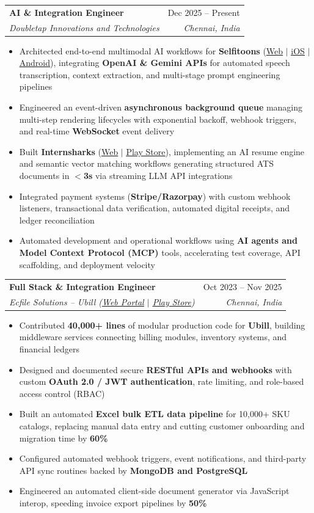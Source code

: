 \documentclass[letterpaper,10pt]{article}
\makeatletter
\newcommand{\resumeItem}[1]{
  \item\small{
    {#1 \vspace{-2pt}}
  }
}
\newcommand{\resumeSubheading}[4]{
  \vspace{-2pt}\item
    \begin{tabular*}{0.97\textwidth}[t]{l@{\extracolsep{\fill}}r}
      \textbf{#1} & #2 \\
      \textit{\small#3} & \textit{\small #4} \\
    \end{tabular*}\vspace{-6pt}
}
\newcommand{\resumeItemListStart}{\begin{itemize}}
\newcommand{\resumeItemListEnd}{\end{itemize}\vspace{-5pt}}
\makeatother
\begin{document}
    \resumeSubheading
      {AI \& Integration Engineer}{Dec 2025 -- Present}
      {Doubletap Innovations and Technologies}{Chennai, India}
      \resumeItemListStart
        \resumeItem{Architected end-to-end multimodal AI workflows for \textbf{Selfitoons} (\href{https://selfitoons.ai/}{\underline{Web}} $|$ \href{https://apps.apple.com/in/app/selfitoons/id6758597947}{\underline{iOS}} $|$ \href{https://play.google.com/store/apps/details?id=com.doubletap.ai.selfitoons}{\underline{Android}}), integrating \textbf{OpenAI \& Gemini APIs} for automated speech transcription, context extraction, and multi-stage prompt engineering pipelines}
        \resumeItem{Engineered an event-driven \textbf{asynchronous background queue} managing multi-step rendering lifecycles with exponential backoff, webhook triggers, and real-time \textbf{WebSocket} event delivery}
        \resumeItem{Built \textbf{Internsharks} (\href{https://internsharks.ai/}{\underline{Web}} $|$ \href{https://play.google.com/store/apps/details?id=com.doubletap.internsharks.ai}{\underline{Play Store}}), implementing an AI resume engine and semantic vector matching workflows generating structured ATS documents in \textbf{$<$3s} via streaming LLM API integrations}
        \resumeItem{Integrated payment systems (\textbf{Stripe/Razorpay}) with custom webhook listeners, transactional data verification, automated digital receipts, and ledger reconciliation}
        \resumeItem{Automated development and operational workflows using \textbf{AI agents and Model Context Protocol (MCP)} tools, accelerating test coverage, API scaffolding, and deployment velocity}
      \resumeItemListEnd

    \resumeSubheading
      {Full Stack \& Integration Engineer}{Oct 2023 -- Nov 2025}
      {Ecfile Solutions -- Ubill (\href{https://app.ubill.tech/}{\underline{Web Portal}} $|$ \href{https://play.google.com/store/apps/details?id=com.ubill.tech}{\underline{Play Store}})}{Chennai, India}
      \resumeItemListStart
        \resumeItem{Contributed \textbf{40,000+ lines} of modular production code for \textbf{Ubill}, building middleware services connecting billing modules, inventory systems, and financial ledgers}
        \resumeItem{Designed and documented secure \textbf{RESTful APIs and webhooks} with custom \textbf{OAuth 2.0 / JWT authentication}, rate limiting, and role-based access control (RBAC)}
        \resumeItem{Built an automated \textbf{Excel bulk ETL data pipeline} for 10,000+ SKU catalogs, replacing manual data entry and cutting customer onboarding and migration time by \textbf{60\%}}
        \resumeItem{Configured automated webhook triggers, event notifications, and third-party API sync routines backed by \textbf{MongoDB and PostgreSQL}}
        \resumeItem{Engineered an automated client-side document generator via JavaScript interop, speeding invoice export pipelines by \textbf{50\%}}
      \resumeItemListEnd
\end{document}
